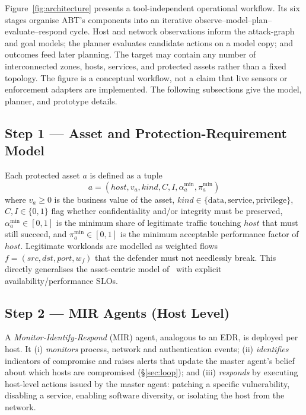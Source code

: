 \documentclass[conference]{IEEEtran}
\begin{document}
Figure~\ref{fig:architecture} presents a tool-independent operational workflow.
Its six stages organise ABT's components into an iterative
observe--model--plan--evaluate--respond cycle. Host and network observations inform
the attack-graph and goal models; the planner evaluates candidate actions on a model
copy; and outcomes feed later planning. The target may contain any number of
interconnected zones, hosts, services, and protected assets rather than a fixed
topology. The figure is a conceptual workflow, not a claim that live sensors or
enforcement adapters are implemented. The following subsections give the model,
planner, and prototype details.

\subsection{Step 1 --- Asset and Protection-Requirement Model}
\label{sec:assets}

Each protected asset $a$ is defined as a tuple
\[
a = (\mathit{host}, v_a, \mathit{kind}, C, I, \alpha^{\min}_a, \pi^{\min}_a)
\]
where $v_a \ge 0$ is the business value of the asset, $\mathit{kind}\in\{\text{data},
\text{service}, \text{privilege}\}$, $C,I\in\{0,1\}$ flag whether confidentiality
and/or integrity must be preserved, $\alpha^{\min}_a\in[0,1]$ is the minimum share of
legitimate traffic touching $\mathit{host}$ that must still succeed, and
$\pi^{\min}_a\in[0,1]$ is the minimum acceptable performance factor of
$\mathit{host}$. Legitimate workloads are modelled as weighted flows
$f=(\mathit{src},\mathit{dst},\mathit{port},w_f)$ that the defender must not
needlessly break. This directly generalises the asset-centric model
of~\cite{maritime2021} with explicit availability/performance SLOs.

\subsection{Step 2 --- MIR Agents (Host Level)}
\label{sec:mir}

A \emph{Monitor-Identify-Respond} (MIR) agent, analogous to an EDR, is deployed per
host. It (i) \emph{monitors} process, network and authentication events; (ii)
\emph{identifies} indicators of compromise and raises alerts that update the master
agent's belief about which hosts are compromised (\S\ref{sec:loop}); and (iii)
\emph{responds} by executing host-level actions issued by the master agent: patching
a specific vulnerability, disabling a service, enabling software diversity, or
isolating the host from the network.
\end{document}
